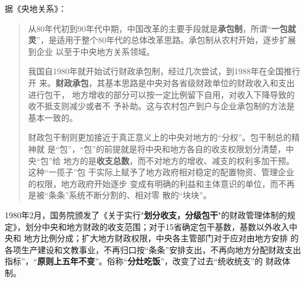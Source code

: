 据《央地关系》：
\begin{quotation}
  从80年代初到90年代中期，中国改革的主要手段就是\textbf{承包制}，所谓“\textbf{一包就
    灵}”，是适用于整个80年代的总体改革思路。承包制从农村开始，逐步扩展到企业
  以至于中央地方关系领域。

  我国自1980年就开始试行财政承包制，经过几次尝试，到1988年在全国推行开
  来。\textbf{财政承包}，其基本思路是中央对各省级财政单位的财政收入和支出进行包干，
  地方增收的部分可以按一定比例留下自用，对收入下降导致的收不抵支则减少或者不
  予补助。这与农村包产到户与企业承包制的方法是基本一致的。

  财政包干制则更加接近于真正意义上的中央对地方的“分权”。包干制总的精神就
  是“包”，“包”的前提就是将中央和地方各自的收支权限划分清楚，中央“包”给
  地方的是\textbf{收支总数}，而不对地方的增收、减支的权利多加干预。这种“一揽子”包
  干实际上赋予了地方政府相对稳定的配置物资、管理企业的权限，地方政府开始逐步
  变成有明确的利益和主体意识的单位，而不再是被“条条”系统不断分割的、相对零
  散的“块块”。
\end{quotation}

1980年2月，国务院颁发了《关于实行"\textbf{划分收支，分级包干}"的财政管理体制的规
定》，划分中央和地方财政的收支范围；对于15省确定包干基数，基数以外收入中央和
地方比例分成；扩大地方财政权限，中央各主管部门对于应对由地方安排
的各项生产建设和文教事业，不再归口按“条条”安排支出，不再向地方分配财政支出
指标”，“\textbf{原则上五年不变}”。俗称“\textbf{分灶吃饭}”，改变了过去“统收统支”的
财政体制。

